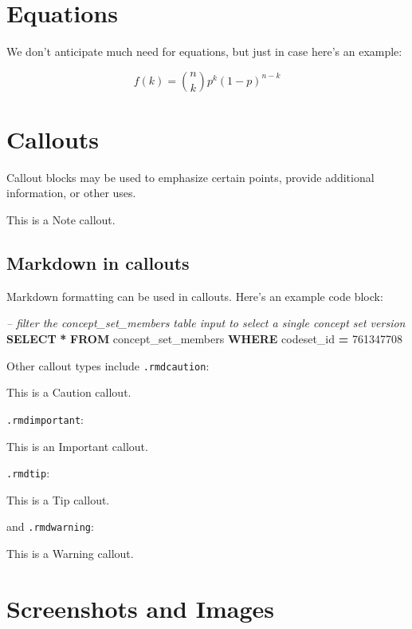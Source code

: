 \documentclass[
]{book}
\newenvironment{Shaded}{\begin{snugshade}}{\end{snugshade}}
\newcommand{\CommentTok}[1]{\textcolor[rgb]{0.56,0.35,0.01}{\textit{#1}}}
\newcommand{\DecValTok}[1]{\textcolor[rgb]{0.00,0.00,0.81}{#1}}
\newcommand{\KeywordTok}[1]{\textcolor[rgb]{0.13,0.29,0.53}{\textbf{#1}}}
\newcommand{\NormalTok}[1]{#1}
\newcommand{\OperatorTok}[1]{\textcolor[rgb]{0.81,0.36,0.00}{\textbf{#1}}}
\begin{document}
\hypertarget{equations}{%
\section{Equations}\label{equations}}

We don't anticipate much need for equations, but just in case here's an example:

\begin{equation}
  f\left(k\right) = \binom{n}{k} p^k\left(1-p\right)^{n-k}
  \label{eq:binom}
\end{equation}

\hypertarget{callouts}{%
\section{Callouts}\label{callouts}}

Callout blocks may be used to emphasize certain points, provide additional information, or other uses.

This is a Note callout.

\hypertarget{markdown-in-callouts}{%
\subsection{Markdown in callouts}\label{markdown-in-callouts}}

Markdown formatting can be used in callouts. Here's an example code block:

\begin{Shaded}
\begin{Highlighting}[]
\CommentTok{-- filter the concept_set_members table input to select a single concept set version}
\KeywordTok{SELECT} \OperatorTok{*}
\KeywordTok{FROM}\NormalTok{ concept_set_members}
\KeywordTok{WHERE}\NormalTok{ codeset_id }\OperatorTok{=} \DecValTok{761347708}
\end{Highlighting}
\end{Shaded}

Other callout types include \texttt{.rmdcaution}:

This is a Caution callout.

\texttt{.rmdimportant}:

This is an Important callout.

\texttt{.rmdtip}:

This is a Tip callout.

and \texttt{.rmdwarning}:

This is a Warning callout.

\hypertarget{screenshots-and-images}{%
\section{Screenshots and Images}\label{screenshots-and-images}}
\end{document}
